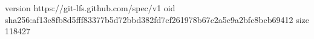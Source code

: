 version https://git-lfs.github.com/spec/v1
oid sha256:af13e8fb8d5fff83377b5d72bbd382fd7cf261978b67c2a5c9a2bfc8bcb69412
size 118427
